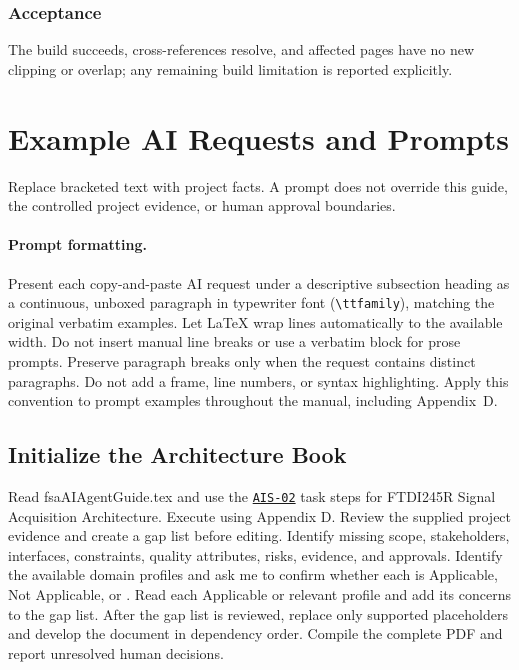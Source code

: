 \subsubsection*{Acceptance}
\label{Section:AIBuildAcceptance}
The build succeeds, cross-references resolve, and affected pages have no new clipping or overlap; any remaining build limitation is reported explicitly.

\section{Example AI Requests and Prompts}
\label{Section:AIExamplePrompts}
Replace bracketed text with project facts. A prompt does not override this
guide, the controlled project evidence, or human approval boundaries.

\paragraph{Prompt formatting.}\label{Section:AIPromptFormatting}
Present each copy-and-paste AI request under a descriptive subsection heading
as a continuous, unboxed paragraph in typewriter font (\texttt{\textbackslash ttfamily}), matching the original
verbatim examples.
Let LaTeX wrap lines automatically to the available width. Do not insert manual
line breaks or use a verbatim block for prose prompts. Preserve paragraph
breaks only when the request contains distinct paragraphs. Do not add a frame,
line numbers, or syntax highlighting. Apply this convention
to prompt examples throughout the manual, including Appendix~D.

\subsection{Initialize the Architecture Book}
\label{Section:AIInitializePrompt}
\begingroup\ttfamily\raggedright
\noindent Read fsaAIAgentGuide.tex and use the \hyperref[Skill:AIS-02]{\texttt{AIS-02}} task steps for FTDI245R Signal Acquisition Architecture. Execute using Appendix D. Review the supplied project evidence and create a gap list before editing. Identify missing scope, stakeholders, interfaces, constraints, quality attributes, risks, evidence, and approvals. Identify the available domain profiles and ask me to confirm whether each is Applicable, Not Applicable, or \OwnedTBD{}. Read each Applicable or relevant \OwnedTBD{} profile and add its concerns to the gap list. After the gap list is reviewed, replace only supported placeholders and develop the document in dependency order. Compile the complete PDF and report unresolved human decisions.\par
\endgroup


